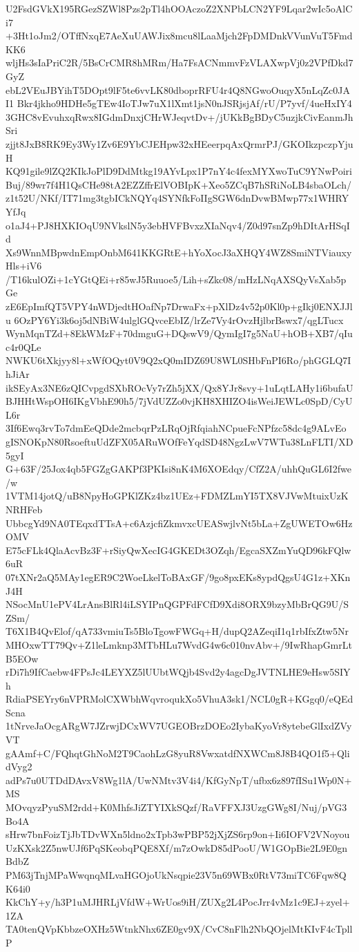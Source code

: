 U2FsdGVkX195RGezSZWl8Pzs2pTl4hOOAczoZ2XNPbLCN2YF9Lqar2wIc5oAlCi7
+3Ht1oJm2/OTffNxqE7AeXuUAWJix8mcu8lLaaMjch2FpDMDnkVVunVuT5FmdKK6
wljHs3sIaPriC2R/5BsCrCMR8hMRm/Ha7FsACNmmvFzVLAXwpVj0z2VPfDkd7GyZ
ebL2VEuJBYihT5DOpt9lF5te6vvLK80dboprRFU4r4Q8NGwoOuqyX5nLqZc0JAI1
Bkr4jkho9HDHe5gTEw4IoTJw7uX1lXmt1jsN0nJSRjsjAf/rU/P7yvf/4ueHxIY4
3GHC8vEvuhxqRwx8IGdmDnxjCHrWJeqvtDv+/jUKkBgBDyC5uzjkCivEanmJhSri
zjjt8JxB8RK9Ey3Wy1Zv6E9YbCJEHpw32xHEeerpqAxQrmrPJ/GKOIkzpczpYjuH
KQ91gile9lZQ2KIkJoPlD9DdMtkg19AYvLpx1P7nY4c4fexMYXwoTuC9YNwPoiri
Buj/89wr7f4H1QsCHe98tA2EZZffrElVOBIpK+Xeo5ZCqB7hSRiNoLB4sbaOLch/
z1t52U/NKf/IT71mg3tgbICkNQYq4SYNfkFoIIgSGW6dnDvwBMwp77x1WHRYYfJq
o1aJ4+PJ8HXKIOqU9NVkslN5y3ebHVFBvxzXIaNqv4/Z0d97snZp9hDItArHSqId
Xs9WnnMBpwdnEmpOnbM641KKGRtE+hYoXocJ3aXHQY4WZ8SmiNTViauxyHls+iV6
/T16kulOZi+1cYGtQEi+r85wJ5Ruuoe5/Lih+sZkc08/mHzLNqAXSQyVsXab5pGe
zE6EpImfQT5VPY4nWDjedtHOafNp7DrwaFx+pXlDz4v52p0Kl0p+gIkj0ENXJJlu
6OzPY6Yi3k6oj5dNBiW4ulglGQvceEbIZ/lrZe7Vy4rOvzHjlbrBswx7/qgLTucx
WynMqnTZd+8EkWMzF+70dmguG+DQswV9/QymIgI7g5NaU+hOB+XB7/qIuc4r0QLe
NWKU6tXkjyy8l+xWfOQyt0V9Q2xQ0mIDZ69U8WL0SHbFnPI6Ro/phGGLQ7IhJiAr
ikSEyAx3NE6zQICvpgdSXbROcVy7rZh5jXX/Qx8YJr8svy+1uLqtLAHy1i6bufaU
BJHHtWspOH6IKgVbhE90h5/7jVdUZZo0vjKH8XHIZO4isWeiJEWLc0SpD/CyUL6r
3If6Ewq3rvTo7dmEeQDde2mcbqrPzLRqOjRfqiahNCpueFcNPfzc58dc4g9ALvEo
gISNOKpN80RsoeftuUdZFX05ARuWOfFeYqdSD48NgzLwV7WTu38LnFLTI/XD5gyI
G+63F/25Jox4qb5FGZgGAKPf3PKIsi8nK4M6XOEdqy/CfZ2A/uhhQuGL6I2fwe/w
1VTM14jotQ/uB8NpyHoGPKlZKz4bz1UEz+FDMZLmYI5TX8VJVwMtuixUzKNRHFeb
UbbcgYd9NA0TEqxdTTsA+c6AzjcfiZkmvxcUEASwjlvNt5bLa+ZgUWETOw6HzOMV
E75cFLk4QlaAcvBz3F+rSiyQwXecIG4GKEDt3OZqh/EgcaSXZmYuQD96kFQlw6uR
07tXNr2aQ5MAy1egER9C2WoeLkelToBAxGF/9go8pxEKs8ypdQgsU4G1z+XKnJ4H
NSocMnU1ePV4LrAnsBlRl4iLSYIPnQGPFdFCfD9Xdi8ORX9bzyMbBrQG9U/SZSm/
T6X1B4QvElof/qA733vmiuTs5BloTgowFWGq+H/dupQ2AZeqiI1q1rbIfxZtw5Nr
MHOxwTT79Qv+Z1leLmknp3MTbHLu7WvdG4w6c010nvAbv+/9IwRhapGmrLtB5EOw
rDi7h9IfCaebw4FPsJc4LEYXZ5lUUbtWQjb4Svd2y4agcDgJVTNLHE9eHsw5SIYh
RdiaPSEYry6nVPRMolCXWbhWqvroqukXo5VhuA3sk1/NCL0gR+KGgq0/eQEdScna
1tNrveJaOcgARgW7JZrwjDCxWV7UGEOBrzDOEo2IybaKyoVr8ytebeGlIxdZVyVT
gAAmf+C/FQhqtGhNoM2T9CaohLzG8yuR8VwxatdfNXWCm8J8B4QO1f5+QlidVyg2
adPs7u0UTDdDAvxV8Wg1lA/UwNMtv3V4i4/KfGyNpT/ufbx6z897fISu1Wp0N+MS
MOvqyzPyuSM2rdd+K0MhfsJiZTYIXkSQzf/RaVFFXJ3UzgGWg8I/Nuj/pVG3Bo4A
sHrw7bnFoizTjJbTDvWXn5ldno2xTpb3wPBP52jXjZS6rp9on+Ii6IOFV2VNoyou
UzKXsk2Z5nwUJf6PqSKeobqPQE8Xf/m7zOwkD85dPooU/W1GOpBie2L9E0gnBdbZ
PM63jTnjMPaWwqnqMLvaHGOjoUkNsqpie23V5n69WBx0RtV73miTC6Fqw8QK64i0
KkChY+y/h3P1uMJHRLjVfdW+WrUos9iH/ZUXg2L4PocJrr4vMz1c9EJ+zyel+1ZA
TA0tenQVpKbbzeOXHz5WtnkNhx6ZE0gv9X/CvC8nFlh2NbQOjelMtKIvF4cTpllP
